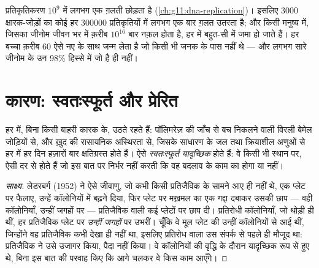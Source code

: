 \begin{example}[उत्परिवर्तन की दर]\label{ex:g11:mutations:frequency}
प्रतिकृतिकरण $10^9$  में लगभग एक ग़लती छोड़ता है
(\cref{ch:g11:dna-replication})। इसलिए $\num{3000}$ क्षारक-जोड़ों का कोई
 हर $\num{300000}$ प्रतिकृतियों में लगभग एक बार ग़लत उतरता है;
और किसी मनुष्य में, जिसका जीनोम जीवन भर में क़रीब $10^{16}$ बार नक़ल होता
है, हर  में बहुत-सी  में  जमा हो जाते हैं। हर बच्चा
क़रीब 60 ऐसे नए  के साथ जन्म लेता है जो किसी भी जनक के पास
नहीं थे --- और लगभग सारे जीनोम के उन 98\% हिस्से में जो  है ही नहीं।
\end{example}

\section{कारण: स्वतःस्फूर्त और प्रेरित}

\begin{proposition}[स्वतःस्फूर्त उत्परिवर्तन]\label{prop:g11:mutations:spontaneous}
 हर  में, बिना किसी बाहरी कारक के, उठते रहते हैं:
पॉलिमरेज़ की जाँच से बच निकलने वाली विरली बेमेल जोड़ियों से, और ख़ुद 
की रासायनिक अस्थिरता से, जिसके  साधारण  के जल तथा
क्रियाशील अणुओं से हर  में हर दिन हज़ारों बार क्षतिग्रस्त होते हैं।
ऐसे \emph{स्वतःस्फूर्त } \emph{यादृच्छिक} होते हैं: वे किसी
भी स्थान पर, ऐसी दर से होते हैं जो इस बात पर निर्भर नहीं करती कि वह
बदलाव  के काम का होगा या नहीं।
\end{proposition}
\begin{proof}[साक्ष्य]
लेडरबर्ग (1952) ने ऐसे जीवाणु, जो कभी किसी प्रतिजैविक के सामने आए ही नहीं
थे, एक प्लेट पर फैलाए, उन्हें कॉलोनियों में बढ़ने दिया, फिर प्लेट पर
मख़मल का एक गद्दा दबाकर उसकी छाप --- वही कॉलोनियाँ, उन्हीं जगहों पर ---
प्रतिजैविक वाली कई प्लेटों पर छाप दी। प्रतिरोधी कॉलोनियाँ, जो थोड़ी ही
थीं, हर प्रतिजैविक प्लेट पर \emph{उन्हीं जगहों} पर उभरीं। चूँकि वे मूल
प्लेट की उन्हीं कॉलोनियों से आई थीं, जिन्होंने वह प्रतिजैविक कभी देखा ही
नहीं था, इसलिए प्रतिरोध वाला  उस संपर्क से पहले ही मौजूद था:
प्रतिजैविक ने उसे उजागर किया, पैदा नहीं किया। वे  कॉलोनियों की
वृद्धि के दौरान यादृच्छिक रूप से हुए थे, बिना इस बात की परवाह किए कि आगे
चलकर वे किस काम आएँगे।
\end{proof}

